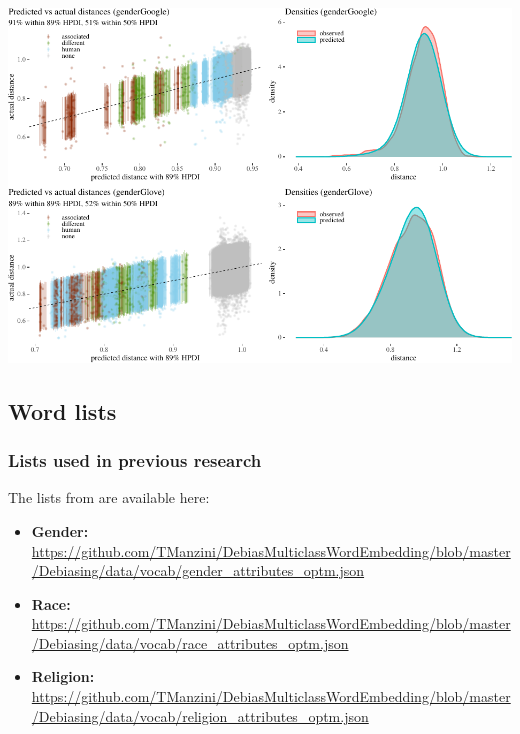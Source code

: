 \documentclass{clv3}
\begin{document}
\begin{center}\includegraphics[width=1\linewidth]{figures/figposteriorPrCheckAppendixd} \end{center}

\pagebreak

\hypertarget{word-lists}{%
\subsection{Word lists}\label{word-lists}}

\label{appendix:word}

\hypertarget{lists-used-in-previous-research}{%
\subsubsection{Lists used in previous
research}\label{lists-used-in-previous-research}}

\label{appendix:manzini_word_lists} The lists from \citet{Manzini2019blackToCriminal} are
available here:

\begin{itemize}
\item
  \textbf{Gender:}
  \url{https://github.com/TManzini/DebiasMulticlassWordEmbedding/blob/master/Debiasing/data/vocab/gender_attributes_optm.json}
\item
  \textbf{Race:}
  \url{https://github.com/TManzini/DebiasMulticlassWordEmbedding/blob/master/Debiasing/data/vocab/race_attributes_optm.json}
\item
  \textbf{Religion:}
  \url{https://github.com/TManzini/DebiasMulticlassWordEmbedding/blob/master/Debiasing/data/vocab/religion_attributes_optm.json}
\end{itemize}
\end{document}
